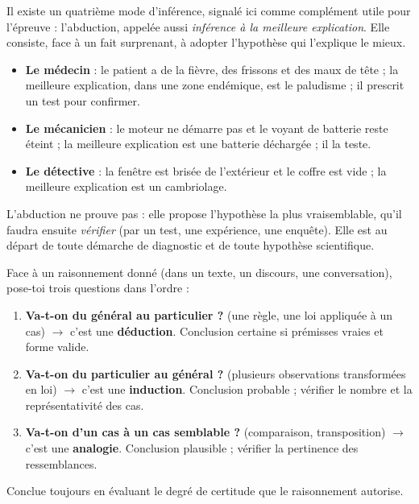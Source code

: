 \documentclass[11pt]{article}
\newcommand{\cle}[1]{{\popxbold\color{popdark}#1}}
\begin{document}
Il existe un quatrième mode d'inférence, signalé ici comme complément utile pour l'épreuve : l'\cle{abduction}, appelée aussi \emph{inférence à la meilleure explication}. Elle consiste, face à un fait surprenant, à adopter l'hypothèse qui l'explique le mieux.

\begin{itemize}
\item \textbf{Le médecin} : le patient a de la fièvre, des frissons et des maux de tête ; la meilleure explication, dans une zone endémique, est le paludisme ; il prescrit un test pour confirmer.
\item \textbf{Le mécanicien} : le moteur ne démarre pas et le voyant de batterie reste éteint ; la meilleure explication est une batterie déchargée ; il la teste.
\item \textbf{Le détective} : la fenêtre est brisée de l'extérieur et le coffre est vide ; la meilleure explication est un cambriolage.
\end{itemize}

L'abduction ne prouve pas : elle propose l'hypothèse la plus vraisemblable, qu'il faudra ensuite \emph{vérifier} (par un test, une expérience, une enquête). Elle est au départ de toute démarche de diagnostic et de toute hypothèse scientifique.

\begin{methode}
Face à un raisonnement donné (dans un texte, un discours, une conversation), pose-toi trois questions dans l'ordre :
\begin{enumerate}
\item \textbf{Va-t-on du général au particulier ?} (une règle, une loi appliquée à un cas) $\rightarrow$ c'est une \textbf{déduction}. Conclusion certaine si prémisses vraies et forme valide.
\item \textbf{Va-t-on du particulier au général ?} (plusieurs observations transformées en loi) $\rightarrow$ c'est une \textbf{induction}. Conclusion probable ; vérifier le nombre et la représentativité des cas.
\item \textbf{Va-t-on d'un cas à un cas semblable ?} (comparaison, transposition) $\rightarrow$ c'est une \textbf{analogie}. Conclusion plausible ; vérifier la pertinence des ressemblances.
\end{enumerate}
Conclue toujours en évaluant le degré de certitude que le raisonnement autorise.
\end{methode}
\end{document}
